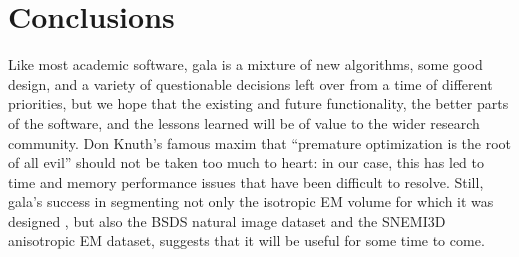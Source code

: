 \documentclass{frontiersSCNS} %
\begin{document}
\section{Conclusions}

Like most academic software, gala is a mixture of new algorithms, some good design, and a variety of questionable decisions left over from a time of different priorities, but we hope that the existing and future functionality, the better parts of the software, and the lessons learned will be of value to the wider research community.
Don Knuth's famous maxim that ``premature optimization is the root of all evil'' \citep{knuth74opt} should not be taken too much to heart: in our case, this has led to time and memory performance issues that have been difficult to resolve.
Still, gala's success in segmenting not only the isotropic EM volume for which it was designed \citep{Glasner:2011uk, NunezIglesias:2013cd}, but also the BSDS natural image dataset and the SNEMI3D anisotropic EM dataset, suggests that it will be useful for some time to come.



%




\end{document}
